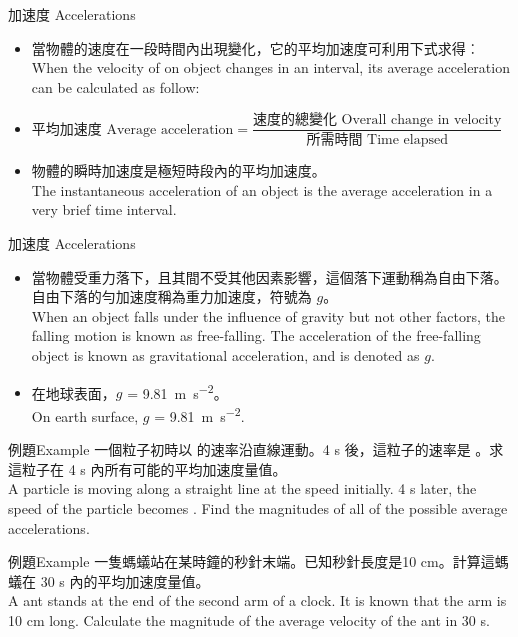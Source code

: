 \documentclass[beamer=true]{standalone}
\begin{document}
\begin{frame}{加速度 Accelerations}
    \begin{itemize}
        \item 當物體的速度在一段時間內出現變化，它的平均加速度可利用下式求得︰\\When the velocity of on object changes in an interval, its average acceleration can be calculated as follow:
        \item $\textrm{平均加速度 Average acceleration}=\dfrac{\textrm{速度的總變化 Overall change in velocity}}{\textrm{所需時間 Time elapsed}}$
        \item 物體的瞬時加速度是極短時段內的平均加速度。 \\The instantaneous acceleration of an object is the average acceleration in a very brief time interval.
    \end{itemize}
\end{frame}
\begin{frame}{加速度 Accelerations}
    \begin{itemize}
        \item 當物體受重力落下，且其間不受其他因素影響，這個落下運動稱為自由下落。自由下落的勻加速度稱為重力加速度，符號為 $\mathit{g}$。 \\When an object falls under the influence of gravity but not other factors, the falling motion is known as free-falling. The acceleration of the free-falling object is known as gravitational acceleration, and is denoted as $\mathit{g}$.
        \item 在地球表面，$\mathit{g}$ = \qty{9.81}{m.s^{-2}}。 \\On earth surface, $\mathit{g}$ = \qty{9.81}{m.s^{-2}}.
    \end{itemize}
\end{frame}
\begin{frame}[t]{例題Example}
    一個粒子初時以  的速率沿直線運動。4 s 後，這粒子的速率是 。求這粒子在 4 s 內所有可能的平均加速度量值。 \\A particle is moving along a straight line at the speed  initially. 4 s later, the speed of the particle becomes . Find the magnitudes of all of the possible average accelerations.
\end{frame}
\begin{frame}[t]{例題Example}
    一隻螞蟻站在某時鐘的秒針末端。已知秒針長度是10 cm。計算這螞蟻在 30 s 內的平均加速度量值。 \\A ant stands at the end of the second arm of a clock. It is known that the arm is 10 cm long. Calculate the magnitude of the average velocity of the ant in 30 s.
\end{frame}
\end{document}
